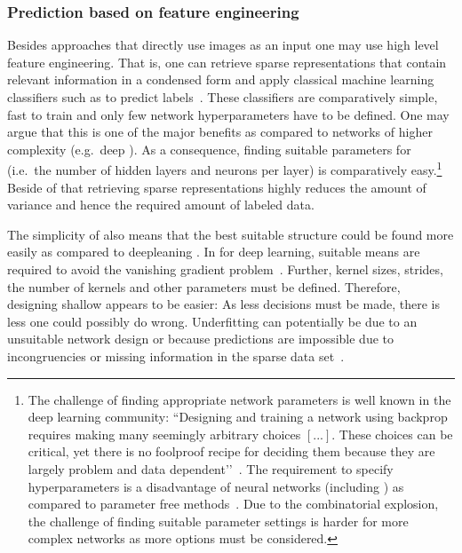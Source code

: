 \subsubsection{Prediction based on feature engineering}
\label{subsec:FeatureEngineering}

Besides approaches that directly use images as an input one may use high level feature engineering. That is, one can retrieve sparse representations that contain relevant information in a condensed form and apply classical machine learning classifiers such as  to predict labels~\citep{zheng2018feature}. These classifiers are comparatively simple, fast to train and only few network hyperparameters have to be defined. One may argue that this is one of the major benefits as compared to networks of higher complexity (e.g.\ deep ). As a consequence, finding suitable parameters for  (i.e.\ the number of hidden layers and neurons per layer) is comparatively easy.\footnote{The challenge of finding appropriate network parameters is well known in the deep learning community: ``Designing and training a network using backprop requires making many seemingly arbitrary choices $[...]$. These choices can be critical, yet there is no foolproof recipe for deciding them because they are largely problem and data dependent’’~\citep[p.~9]{lecun2012efficient}. The requirement to specify hyperparameters is a disadvantage of neural networks (including ) as compared to parameter free methods~\citep{scikit2019neural}. Due to the combinatorial explosion, the challenge of finding suitable parameter settings is harder for more complex networks as more options must be considered.} Beside of that retrieving sparse representations highly reduces the amount of variance and hence the required amount of labeled data.

The simplicity of  also means that the best suitable structure could be found more easily as compared to deepleaning . In  for deep learning, suitable means are required to avoid the vanishing gradient problem~\citep{wang2019vanishing}. Further, kernel sizes, strides, the number of kernels and other parameters must be defined. Therefore, designing shallow  appears to be easier: As less decisions must be made, there is less one could possibly do wrong. Underfitting can potentially be due to an unsuitable network design or because predictions are impossible due to incongruencies or missing information in the sparse data set~\citep{lecun2012efficient}. 

